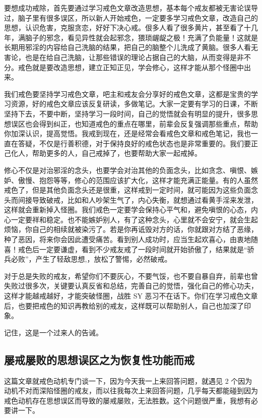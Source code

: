 \documentclass{ctexart}
\begin{document}
要想成功戒除，首先要通过学习戒色文章改造思想，基本每个戒友都被无害论误导过，脑子里有很多误区，所以新人开始戒色，一定要多学习戒色文章，改造自己的思想，认识危害，克服贪恋，好好下决心戒。佷多人看了很多黄片，甚至看了十几年，满脑子的邪念，看见异性就会起邪念，猥琐龌龊之极！充满了负能量！这就是长期用邪淫的内容给自己洗脑的结果，把自己的脑整个儿洗成了黄脑。很多人看无害论，也是在给自己洗脑，让那些错误的理论占据自己的大脑，从而变得是非不分。戒色就是要改造思想，建立正知正见，学会修心，这样才能从那个怪圈中出来。

我们戒色要坚持学习戒色文章，吧主和戒友会分享好的戒色文章，这都是宝贵的学习资源，好的戒色文章应该反复研读，多做笔记。大家一定要有学习的日课，不断坚持下去，不要中断，坚持学习一段时间，自己的觉悟就会有明显的提升，很多思想误区也会得到纠正，也知道戒色的重点在哪里，前辈会反复强调那些重点，帮助你加深认识，提高觉悟。我戒到现在，还是经常会看戒色文章和戒色笔记，我也一直在答疑，不仅是行善积德，对于保持良好的戒色状态也是非常重要的。我们要正己化人，帮助更多的人，自己戒掉了，也要帮助大家一起戒掉。

修心不仅是对治邪淫的念头，也要学会对治其他的负面念头，比如贪念、嗔恨、嫉妒、傲慢、抱怨等等，修心的范围应该扩大化，这样才能充满正能量。有的人虽然戒色了，但是其他负面念头还是很重，这样戒到一定时间，就可能因为这些负面念头而间接导致破戒，比如和人吵架生气了，内心失衡，就想通过看黄手淫来发泄，这样就会重新掉入怪圈。我们戒色一定要学会保持心平气和，避免嗔恨的心态，内心一定要祥和稳定。也不能嫉妒别人，有了这种念头，心里就不会安宁，就会生起烦恼，你自己的相续就被染污了。若是你再诋毁对方的话，你就跟对方结了恶缘，种了恶因，将来你会因此遭受痛苦。看到别人成功时，应当生起欢喜心，由衷地随喜！戒色后一定要谦虚，看到不少戒友戒了一段时间就开始骄傲了，结果就是“骄兵必败”，产生了轻敌思想,，放松了警惕，必然破戒。

对于总是失败的戒友，希望你们不要灰心，不要气馁，也不要自暴自弃，前辈也曾失败过很多次，关键要认真反省和总结，完善自己的觉悟，强化自己的修心功夫，这样才能越戒越好，才能突破怪圈，战胜 SY 恶习不在话下。你们在学习戒色文章后，也要把戒色的知识再教给别的戒友，这样既可以帮助别人，自己也加深了印象。

记住，这是一个过来人的告诫。

\subsection{屡戒屡败的思想误区之为恢复性功能而戒}

这篇文章就戒色动机专门谈一下，因为今天我一上来回答问题，就遇见 2 个因为动机不对而深陷怪圈的戒友，而以往我每次上来回答问题，几乎每天都能碰到因为戒色动机存在思想误区而导致的屡戒屡败，无法胜数。这个问题很严重，我想有必要讲一下。
\end{document}
